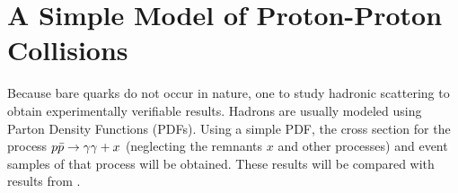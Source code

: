 
\chapter{A Simple Model of Proton-Proton Collisions}%
\label{chap:pdf}

Because bare quarks do not occur in nature, one to study hadronic
scattering to obtain experimentally verifiable results. Hadrons are
usually modeled using Parton Density Functions (PDFs). Using a simple
PDF, the cross section for the process \(p\bar{p}\rightarrow\gamma\gamma + x\) (neglecting the
remnants \(x\) and other processes) and event samples of that process
will be obtained. These results will be compared with results from
\sherpa.
